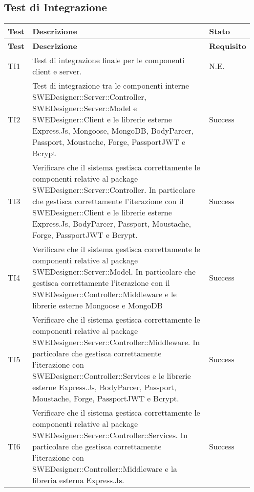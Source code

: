 \subsection{Test di Integrazione}
\begin{longtable}{p{2cm}!{\VRule[1pt]}p{10cm}!{\VRule[1pt]}p{1cm}}
\color{white} \textbf{Test} & \color{white} \textbf{Descrizione}  & \color{white} \textbf{Stato}\\ 
\endfirsthead 
{} 
\color{white} \textbf{Test} & \color{white} \textbf{Descrizione}  & \color{white} \textbf{Requisito}\\  
\endhead 
TI1 & Test di integrazione finale per le componenti client e server. & N.E.\\

TI2 & Test di integrazione tra le componenti interne SWEDesigner::Server::Controller, SWEDesigner::Server::Model e SWEDesigner::Client e le librerie esterne Express.Js, Mongoose, MongoDB, BodyParcer, Passport, Moustache, Forge, PassportJWT e Bcrypt & Success\\

TI3 & Verificare che il sistema gestisca correttamente le componenti relative al package SWEDesigner::Server::Controller. In particolare che gestisca correttamente l'iterazione con il SWEDesigner::Client e le librerie esterne Express.Js, BodyParcer, Passport, Moustache, Forge, PassportJWT e Bcrypt. & Success\\

TI4 & Verificare che il sistema gestisca correttamente le componenti relative al package SWEDesigner::Server::Model. In particolare che gestisca correttamente l'iterazione con il SWEDesigner::Controller::Middleware e le librerie esterne Mongoose e MongoDB  & Success\\

TI5 & Verificare che il sistema gestisca correttamente le componenti relative al package SWEDesigner::Server::Controller::Middleware. In particolare che gestisca correttamente l'iterazione con SWEDesigner::Controller::Services e le librerie esterne Express.Js, BodyParcer, Passport, Moustache, Forge, PassportJWT e Bcrypt. & Success\\

TI6 & Verificare che il sistema gestisca correttamente le componenti relative al package SWEDesigner::Server::Controller::Services. In particolare che gestisca correttamente l'iterazione con SWEDesigner::Controller::Middleware e la libreria esterna Express.Js. & Success\\


\end{longtable}
